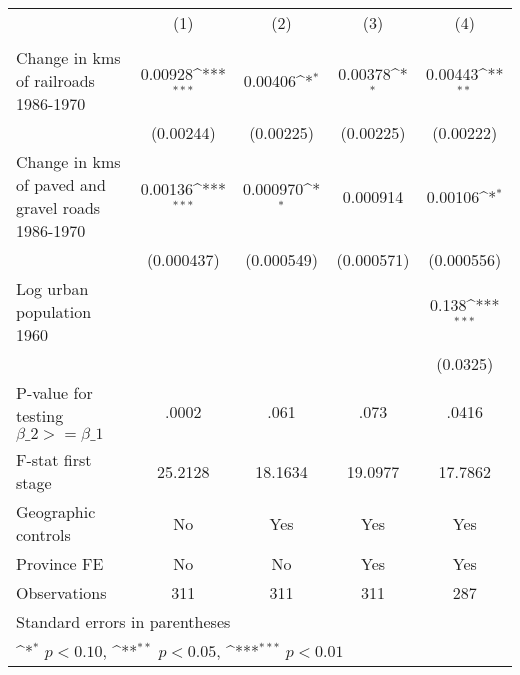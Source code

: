{
\def\sym#1{\ifmmode^{#1}\else\(^{#1}\)\fi}
\begin{tabular}{l*{4}{c}}
\hline\hline
                &\multicolumn{1}{c}{(1)}&\multicolumn{1}{c}{(2)}&\multicolumn{1}{c}{(3)}&\multicolumn{1}{c}{(4)}\\
                &\multicolumn{1}{c}{}&\multicolumn{1}{c}{}&\multicolumn{1}{c}{}&\multicolumn{1}{c}{}\\
\hline
Change in kms of railroads 1986-1970&  0.00928\sym{***}&  0.00406\sym{*}  &  0.00378\sym{*}  &  0.00443\sym{**} \\
                &(0.00244)         &(0.00225)         &(0.00225)         &(0.00222)         \\
[1em]
Change in kms of paved and gravel roads 1986-1970&  0.00136\sym{***}& 0.000970\sym{*}  & 0.000914         &  0.00106\sym{*}  \\
                &(0.000437)         &(0.000549)         &(0.000571)         &(0.000556)         \\
[1em]
Log urban population 1960&                  &                  &                  &    0.138\sym{***}\\
                &                  &                  &                  & (0.0325)         \\
\hline
P-value for testing $\beta\_{2} >= \beta\_{1}$&    .0002         &     .061         &     .073         &    .0416         \\
F-stat first stage&  25.2128         &  18.1634         &  19.0977         &  17.7862         \\
Geographic controls&       No         &      Yes         &      Yes         &      Yes         \\
Province FE     &       No         &       No         &      Yes         &      Yes         \\
Observations    &      311         &      311         &      311         &      287         \\
\hline\hline
\multicolumn{5}{l}{\footnotesize Standard errors in parentheses}\\
\multicolumn{5}{l}{\footnotesize \sym{*} \(p<0.10\), \sym{**} \(p<0.05\), \sym{***} \(p<0.01\)}\\
\end{tabular}
}
